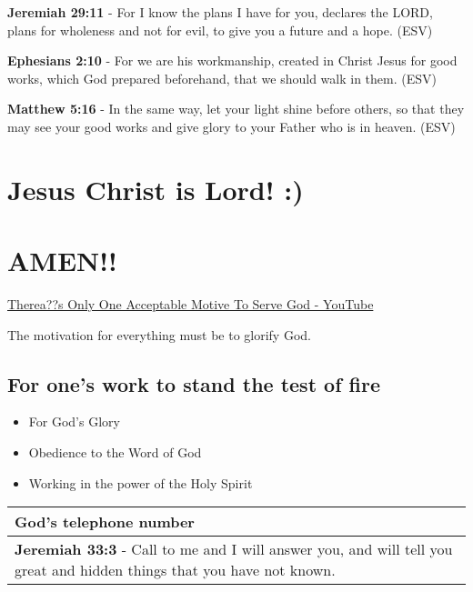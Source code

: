 \documentclass[11pt]{article}
\begin{document}
\textbf{Jeremiah 29:11} -  For I know the plans I have for you, declares the LORD, plans for wholeness and not for evil, to give you a future and a hope.  (ESV)

\textbf{Ephesians 2:10} - For we are his workmanship, created in Christ Jesus for good works, which God prepared beforehand, that we should walk in them. (ESV)

\textbf{Matthew 5:16} - In the same way, let your light shine before others, so that they may see your good works and give glory to your Father who is in heaven. (ESV)

\section{Jesus Christ is Lord! :)}
\label{sec:org31472b8}

\section{AMEN!!}
\label{sec:orga7a9d9f}
\href{https://www.youtube.com/watch?v=TEa3UWFgwnk}{Therea??s Only One Acceptable Motive To Serve God - YouTube}

The motivation for everything must be to glorify God.

\subsection{For one's work to stand the test of fire}
\label{sec:orgd008b4e}
\begin{itemize}
\item For God's Glory
\item Obedience to the Word of God
\item Working in the power of the Holy Spirit
\end{itemize}

\begin{center}
\begin{tabular}{l}
God's telephone number\\[0pt]
\hline
\textbf{Jeremiah 33:3} - Call to me and I will answer you, and will tell you great and hidden things that you have not known.\\[0pt]
\end{tabular}
\end{center}
\end{document}
